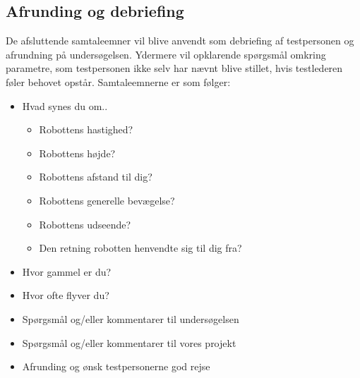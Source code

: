 \subsection{Afrunding og debriefing} 
\label{ParametreAfrundingDebriefing}
%
De afsluttende samtaleemner vil blive anvendt som debriefing af testpersonen og afrundning på undersøgelsen. Ydermere vil opklarende spørgsmål omkring parametre, som testpersonen ikke selv har nævnt blive stillet, hvis testlederen føler behovet opstår. Samtaleemnerne er som følger: \blankline
%
\begin{itemize}
\item Hvad synes du om..
	\begin{itemize}
		\item Robottens hastighed?
		\item Robottens højde?
		\item Robottens afstand til dig?
		\item Robottens generelle bevægelse?
		\item Robottens udseende?
		\item Den retning robotten henvendte sig til dig fra?
	\end{itemize}
\item Hvor gammel er du?
\item Hvor ofte flyver du?
\item Spørgsmål og/eller kommentarer til undersøgelsen 
\item Spørgsmål og/eller kommentarer til vores projekt
\item Afrunding og ønsk testpersonerne god rejse
\end{itemize}

